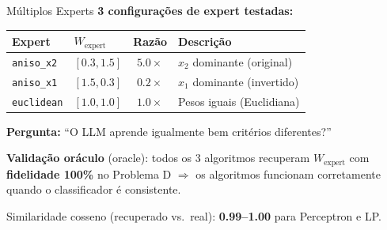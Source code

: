 \documentclass[aspectratio=169,12pt]{beamer}
\begin{document}
\begin{frame}{Múltiplos Experts}
\small
\textbf{3 configurações de expert testadas:}

\begin{center}
\begin{tabular}{llcl}
\toprule
\textbf{Expert} & $W_{\text{expert}}$ & Razão & \textbf{Descrição} \\
\midrule
\texttt{aniso\_x2} & $[0.3, 1.5]$ & $5.0\times$ & $x_2$ dominante (original) \\
\texttt{aniso\_x1} & $[1.5, 0.3]$ & $0.2\times$ & $x_1$ dominante (invertido) \\
\texttt{euclidean} & $[1.0, 1.0]$ & $1.0\times$ & Pesos iguais (Euclidiana) \\
\bottomrule
\end{tabular}
\end{center}

\vspace{0.2cm}
\textbf{Pergunta:} ``O LLM aprende igualmente bem critérios diferentes?''

\vspace{0.2cm}
\textbf{Validação oráculo} (oracle): todos os 3 algoritmos recuperam $W_{\text{expert}}$ com \textbf{fidelidade 100\%} no Problema D $\Rightarrow$ os algoritmos funcionam corretamente quando o classificador é consistente.

\vspace{0.2cm}
Similaridade cosseno (recuperado vs.\ real): \textbf{0.99--1.00} para Perceptron e LP.
\end{frame}
\end{document}
